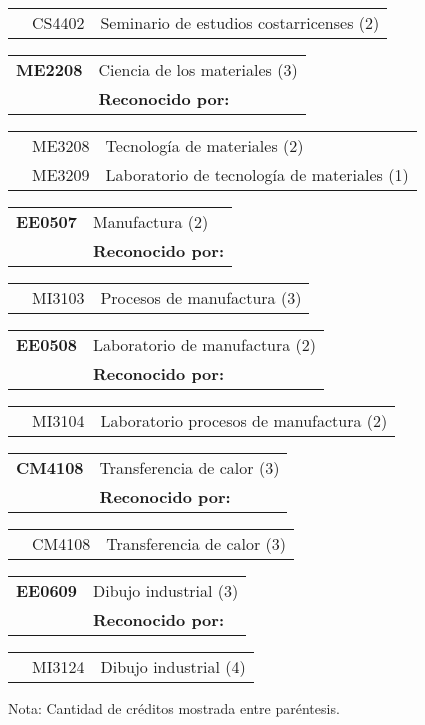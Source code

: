 \documentclass[letterpaper]{article}%
\begin{document}
\begin{tabularx}{\textwidth}{p{1.5cm}p{1.5cm}p{10cm}}%
&CS4402&Seminario de estudios costarricenses (2)\\%
\end{tabularx}%
\begin{tabularx}{\textwidth}{p{1.5cm}p{10cm}}%
\textbf{ME2208}&Ciencia de los materiales (3)\\%
&\textbf{Reconocido por: }\\%
\end{tabularx}%
\begin{tabularx}{\textwidth}{p{1.5cm}p{1.5cm}p{10cm}}%
&ME3208&Tecnología de materiales (2)\\%
&ME3209&Laboratorio de tecnología de materiales (1)\\%
\end{tabularx}%
\begin{tabularx}{\textwidth}{p{1.5cm}p{10cm}}%
\textbf{EE0507}&Manufactura (2)\\%
&\textbf{Reconocido por: }\\%
\end{tabularx}%
\begin{tabularx}{\textwidth}{p{1.5cm}p{1.5cm}p{10cm}}%
&MI3103&Procesos de manufactura (3)\\%
\end{tabularx}%
\begin{tabularx}{\textwidth}{p{1.5cm}p{10cm}}%
\textbf{EE0508}&Laboratorio de manufactura (2)\\%
&\textbf{Reconocido por: }\\%
\end{tabularx}%
\begin{tabularx}{\textwidth}{p{1.5cm}p{1.5cm}p{10cm}}%
&MI3104&Laboratorio procesos de manufactura (2)\\%
\end{tabularx}%
\begin{tabularx}{\textwidth}{p{1.5cm}p{10cm}}%
\textbf{CM4108}&Transferencia de calor (3)\\%
&\textbf{Reconocido por: }\\%
\end{tabularx}%
\begin{tabularx}{\textwidth}{p{1.5cm}p{1.5cm}p{10cm}}%
&CM4108&Transferencia de calor (3)\\%
\end{tabularx}%
\begin{tabularx}{\textwidth}{p{1.5cm}p{10cm}}%
\textbf{EE0609}&Dibujo industrial (3)\\%
&\textbf{Reconocido por: }\\%
\end{tabularx}%
\begin{tabularx}{\textwidth}{p{1.5cm}p{1.5cm}p{10cm}}%
&MI3124&Dibujo industrial (4)\\%
\end{tabularx}%
Nota: Cantidad de créditos mostrada entre paréntesis.
\end{document}
